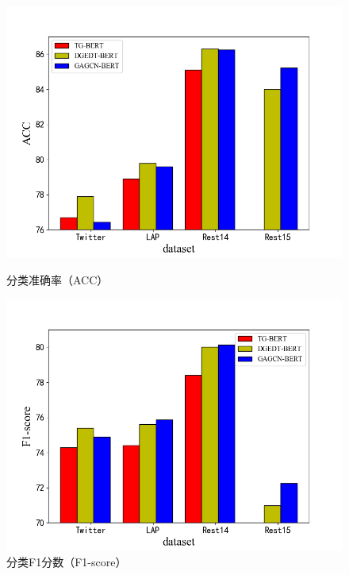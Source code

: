 \begin{figure}[htb]
    \begin{minipage}[t]{0.5\linewidth}
    \centering
    \includegraphics[width=1\textwidth]{pic/BERTACC.png}
    \caption{分类准确率（ACC）}
    \label{with_bert_acc}
    \end{minipage}
    \quad
    \begin{minipage}[t]{0.5\linewidth}
    \centering
    \includegraphics[width=1\textwidth]{pic/BERTF1.png}
    \caption{分类F1分数（F1-score）}
    \label{with_bert_f1}
    \end{minipage}
\end{figure}

